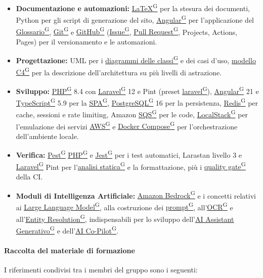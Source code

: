 \documentclass[a4paper,12pt]{article}
\providecommand{\glslink}[2]{\href{https://alittlebyte-19.github.io/Documentazione/glossario.html\#gls-#1}{\underline{#2}\textsuperscript{\scriptsize G}}}
\begin{document}
\begin{itemize}
    \item \textbf{Documentazione e automazioni:} \glslink{latex}{LaTeX} per la stesura dei documenti, Python per gli script di generazione del sito, \glslink{angular}{Angular} per l'applicazione del \glslink{glossario}{Glossario}, \glslink{git}{Git} e \glslink{github}{GitHub} (\glslink{issue}{Issue}, \glslink{pull-request}{Pull Request}, Projects, Actions, Pages) per il versionamento e le automazioni.
    \item \textbf{Progettazione:} UML per i \glslink{diagramma-delle-classi-uml}{diagrammi delle classi} e dei casi d'uso, \glslink{modello-c4}{modello C4} per la descrizione dell'architettura su più livelli di astrazione.
    \item \textbf{Sviluppo:} \glslink{php}{PHP} 8.4 con \glslink{laravel}{Laravel} 12 e Pint (preset \glslink{laravel}{laravel}), \glslink{angular}{Angular} 21 e \glslink{typescript}{TypeScript} 5.9 per la \glslink{spa-single-page-application}{SPA}, \glslink{postgresql}{PostgreSQL} 16 per la persistenza, \glslink{redis}{Redis} per cache, sessioni e rate limiting, Amazon \glslink{sqs-simple-queue-service}{SQS} per le code, \glslink{localstack}{LocalStack} per l'emulazione dei servizi \glslink{aws}{AWS} e \glslink{docker-compose}{Docker Compose} per l'orchestrazione dell'ambiente locale.
    \item \textbf{Verifica:} \glslink{pest}{Pest} \glslink{php}{PHP} e \glslink{jest}{Jest} per i test automatici, Larastan livello 3 e \glslink{laravel}{Laravel} Pint per l'\glslink{analisi-statica}{analisi statica} e la formattazione, più i \glslink{quality-gate}{quality gate} della CI.
    \item \textbf{Moduli di Intelligenza Artificiale:} \glslink{amazon-bedrock}{Amazon Bedrock} e i concetti relativi ai \glslink{llm-large-language-model}{Large Language Model}, alla costruzione dei \glslink{prompt}{prompt}, all'\glslink{ocr-riconoscimento-ottico-dei-caratteri}{OCR} e all'\glslink{entity-resolution}{Entity Resolution}, indispensabili per lo sviluppo dell'\glslink{ai-assistant-generativo}{AI Assistant Generativo} e dell'\glslink{ai-co-pilot-per-consulenti-del-lavoro-cdl}{AI Co-Pilot}.
\end{itemize}

\paragraph{Raccolta del materiale di formazione}
I riferimenti condivisi tra i membri del gruppo sono i seguenti:
\end{document}
